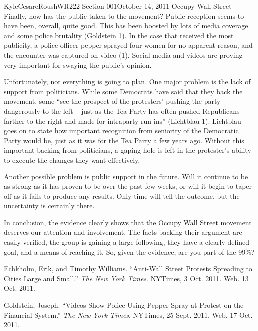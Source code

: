 \documentclass[12pt,letterpaper]{article}
\begin{document}
\begin{mla}{Kyle}{Cesare}{Roush}{WR222 Section 001}{October 14, 2011}{
Occupy Wall Street}
Finally, how has the public taken to the movement?  Public reception seems to
have been, overall, quite good.  This has been boosted by lots of media coverage
and some police brutality (Goldstein 1).  In the case that received the most
publicity, a police officer pepper sprayed four women for no apparent reason,
and the encounter was captured on video (1).  Social media and videos are
proving very important for swaying the public's opinion.

Unfortunately, not everything is going to plan.  One major problem is the lack
of support from politicians.  While some Democrats have said that they back the
movement, some ``see the prospect of the protesters' pushing the party
dangerously to the left -- just as the Tea Party has often pushed Republicans
farther to the right and made for intraparty run-ins'' (Lichtblau 1).  Lichtblau
goes on to state how important recognition from seniority of the Democratic
Party would be, just as it was for the Tea Party a few years ago.  Without this
important backing from politicians, a gaping hole is left in the protester's
ability to execute the changes they want effectively.

Another possible problem is public support in the future.  Will it continue to
be as strong as it has proven to be over the past few weeks, or will it begin to
taper off as it fails to produce any results.  Only time will tell the outcome,
but the uncertainty is certainly there.

In conclusion, the evidence clearly shows that the Occupy Wall Street movement
deserves our attention and involvement.  The facts backing their argument are
easily verified, the group is gaining a large following, they have a clearly
defined goal, and a means of reaching it.  So, given the evidence, are you part
of the 99\%?

\begin{workscited}


\bibent Echkholm, Erik, and Timothy Williams. ``Anti-Wall Street Protests
Spreading to Cities Large and Small.'' \emph{The New York Times}. NYTimes, 3
Oct. 2011.  Web. 13 Oct. 2011.

\bibent Goldstein, Joseph. ``Videos Show Police Using Pepper Spray at Protest on
the Financial System.'' \emph{The New York Times}. NYTimes, 25 Sept. 2011. Web.
17 Oct. 2011.


\end{workscited}
\end{mla}
\end{document}
